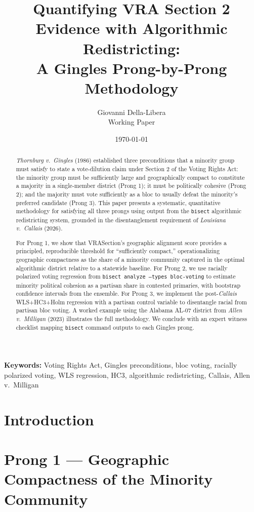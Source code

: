 \documentclass[12pt]{article}
\title{Quantifying VRA Section 2 Evidence with Algorithmic Redistricting:\\
A Gingles Prong-by-Prong Methodology}
\author{Giovanni Della-Libera\\
\small{Working Paper}}
\date{\today}
\begin{document}
\maketitle

\begin{abstract}
\textit{Thornburg v.\ Gingles} (1986) established three preconditions
that a minority group must satisfy to state a vote-dilution claim under
Section 2 of the Voting Rights Act: the minority group must be sufficiently
large and geographically compact to constitute a majority in a
single-member district (Prong 1); it must be politically cohesive (Prong 2);
and the majority must vote sufficiently as a bloc to usually defeat the
minority's preferred candidate (Prong 3).  This paper presents a
systematic, quantitative methodology for satisfying all three prongs using
output from the \texttt{bisect} algorithmic redistricting system, grounded in
the disentanglement requirement of \textit{Louisiana v.\ Callais} (2026).

For Prong 1, we show that VRASection's geographic alignment score provides
a principled, reproducible threshold for ``sufficiently compact,'' operationalizing
geographic compactness as the share of a minority community captured in the
optimal algorithmic district relative to a statewide baseline.  For Prong 2,
we use racially polarized voting regression from \texttt{bisect analyze
--types bloc-voting} to estimate minority political cohesion as a partisan
share in contested primaries, with bootstrap confidence intervals from the
ensemble.  For Prong 3, we implement the post-\textit{Callais} WLS+HC3+Holm
regression with a partisan control variable to disentangle racial from partisan
bloc voting.  A worked example using the Alabama AL-07 district from
\textit{Allen v.\ Milligan} (2023) illustrates the full methodology.
We conclude with an expert witness checklist mapping \texttt{bisect} command
outputs to each Gingles prong.
\end{abstract}

\noindent\textbf{Keywords:} Voting Rights Act, Gingles preconditions, bloc
voting, racially polarized voting, WLS regression, HC3, algorithmic
redistricting, Callais, Allen v.\ Milligan

\section{Introduction}


\section{Prong 1 --- Geographic Compactness of the Minority Community}

\end{document}
